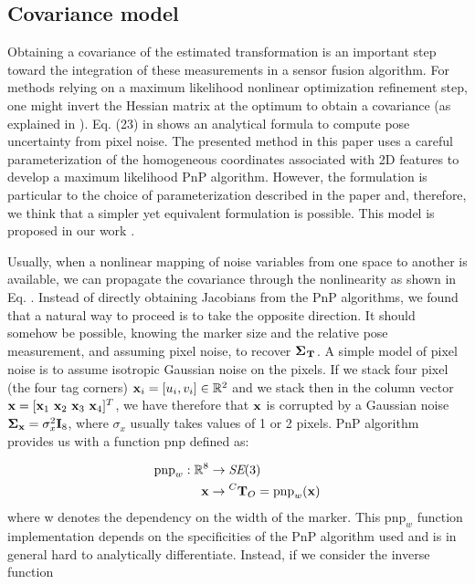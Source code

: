 \subsection{Covariance model}
Obtaining a covariance of the estimated transformation is an important step toward the integration of these measurements in a sensor fusion algorithm.
For methods relying on a maximum likelihood nonlinear optimization refinement step, one might invert the Hessian matrix at the optimum to obtain a covariance 
(as explained in ).
Eq. (23) in \cite{urban2016mlpnp} shows an analytical formula to compute pose uncertainty from pixel noise.
The presented method in this paper uses a careful parameterization of the homogeneous coordinates associated with 2D features to develop
a maximum likelihood PnP algorithm.  However, the formulation is particular to the choice of parameterization described in the paper and, 
therefore, we think that a simpler yet equivalent formulation is possible. This model is proposed in our work \cite{fourmy2019absolute}. 

Usually, when a nonlinear mapping of noise variables from one space to another is available, we can propagate the covariance through the nonlinearity
as shown in Eq. .  
Instead of directly obtaining Jacobians from the PnP algorithms, we found that a natural way to proceed is to take the opposite 
direction. It should somehow be possible, knowing the marker size and the relative pose measurement, and assuming pixel noise, to
recover ${\bm \Sigma}_{\prescript{}{}{{\bf T}}_{}}$. A simple model of pixel noise is to assume isotropic Gaussian noise on the pixels. If we stack four pixel (the four tag corners) 
${\bf x}_i = [u_i, v_i] \in \mathbb{R}^2$ and we stack then in the column vector ${\bf x} = [{\bf x}_1~{\bf x}_2~{\bf x}_3~{\bf x}_4]^T$, we have therefore that
${\bf x}$ is corrupted by a Gaussian noise ${\bm \Sigma}_{{\bf x}} = \sigma_{x}^2 {\bf I}_8$, where $\sigma_{x}$ usually takes values of 1 or 2 pixels.
PnP algorithm provides us with a function $\text{pnp}$ defined as:

\begin{equation}
    \begin{split}
        \text{pnp}_w: \mathbb{R}^8 &\rightarrow \textit{SE}(3) \\
                           {\bf x} &\rightarrow \prescript{C}{}{{\bf T}}_{O} = \text{pnp}_w({\bf x})
    \end{split}
\end{equation}
%
where w denotes the dependency on the width of the marker. This $\text{pnp}_w$ function implementation depends on the specificities of the PnP algorithm used and  
is in general hard to analytically differentiate. Instead, if we consider the inverse function

